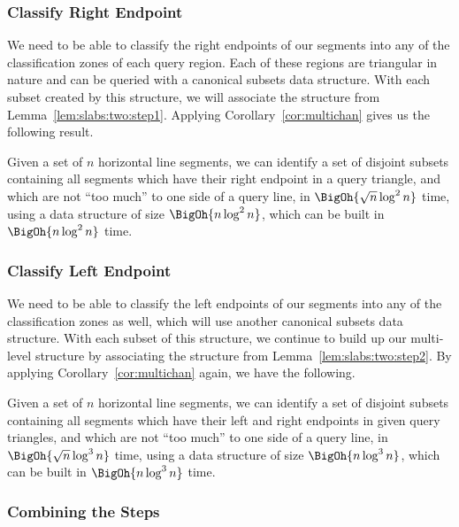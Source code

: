 \subsubsection{Classify Right Endpoint}

We need to be able to classify the right endpoints of our segments into any of the classification zones of each query region.
Each of these regions are triangular in nature and can be queried with a canonical subsets data structure. 
With each subset created by this structure, we will associate the structure from Lemma~\ref{lem:slabs:two:step1}. 
Applying Corollary~\ref{cor:multichan} gives us the following result.

\begin{lemma}
\label{lem:slabs:two:step2}
Given a set of $n$ horizontal line segments, we can identify a set of disjoint subsets containing all segments which have their right endpoint in a query triangle, and which are not ``too much'' to one side of a query line, in $\BigOh{\sqrt{n}\log^2{n}}$ time, using a data structure of size $\BigOh{n\log^2{n}}$, which can be built in $\BigOh{n\log^2{n}}$ time.
\end{lemma}


\subsubsection{Classify Left Endpoint}

We need to be able to classify the left endpoints of our segments into any of the classification zones as well, which will use another canonical subsets data structure.
With each subset of this structure, we continue to build up our multi-level structure by associating the structure from Lemma~\ref{lem:slabs:two:step2}. 
By applying Corollary~\ref{cor:multichan} again, we have the following.

\begin{lemma}
\label{lem:slabs:two:step3}
Given a set of $n$ horizontal line segments, we can identify a set of disjoint subsets containing all segments which have their left and right endpoints in given query triangles, and which are not ``too much'' to one side of a query line, in $\BigOh{\sqrt{n}\log^3{n}}$ time, using a data structure of size $\BigOh{n\log^3{n}}$, which can be built in $\BigOh{n\log^3{n}}$ time.
\end{lemma}


\subsubsection{Combining the Steps}

